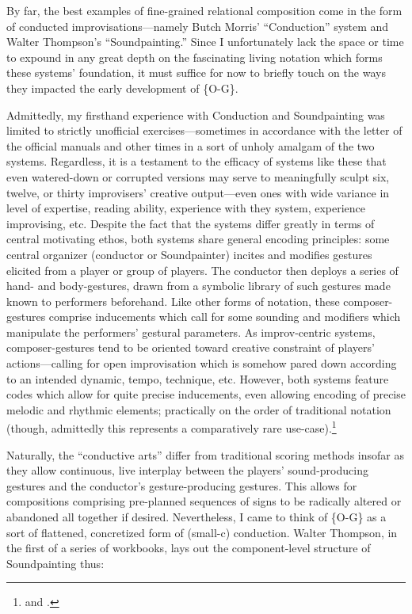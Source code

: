     By far, the best examples of fine-grained relational composition come in the form of conducted improvisations---namely Butch Morris' ``Conduction'' system and Walter Thompson's ``Soundpainting.'' Since I unfortunately lack the space or time to expound in any great depth on the fascinating living notation which forms these systems' foundation, it must suffice for now to briefly touch on the ways they impacted the early development of \{O-G\}.
    
    Admittedly, my firsthand experience with Conduction and Soundpainting was limited to strictly unofficial exercises---sometimes in accordance with the letter of the official manuals and other times in a sort of unholy amalgam of the two systems. Regardless, it is a testament to the efficacy of systems like these that even watered-down or corrupted versions may serve to meaningfully sculpt six, twelve, or thirty improvisers' creative output---even ones with wide variance in level of expertise, reading ability, experience with they system, experience improvising, etc. Despite the fact that the systems differ greatly in terms of central motivating ethos, both systems share general encoding principles: some central organizer (conductor or Soundpainter) incites and modifies gestures elicited from a player or group of players. The conductor then deploys a series of hand- and body-gestures, drawn from a symbolic library of such gestures made known to performers beforehand. Like other forms of notation, these composer-gestures comprise inducements which call for some sounding and modifiers which manipulate the performers' gestural parameters. As improv-centric systems, composer-gestures tend to be oriented toward creative constraint of players' actions---calling for open improvisation which is somehow pared down according to an intended dynamic, tempo, technique, etc. However, both systems feature codes which allow for quite precise inducements, even allowing encoding of precise melodic and rhythmic elements; practically on the order of traditional notation (though, admittedly this represents a comparatively rare use-case).\footnote{\autocite{Morris_2017} and \autocite{Thompson_2006_1}.}

    Naturally, the ``conductive arts'' differ from traditional scoring methods insofar as they allow continuous, live interplay between the players' sound-producing gestures and the conductor's gesture-producing gestures. This allows for compositions comprising pre-planned sequences of signs to be radically altered or abandoned all together if desired. Nevertheless, I came to think of \{O-G\} as a sort of flattened, concretized form of (small-c) conduction. Walter Thompson, in the first of a series of workbooks, lays out the component-level structure of Soundpainting thus:

